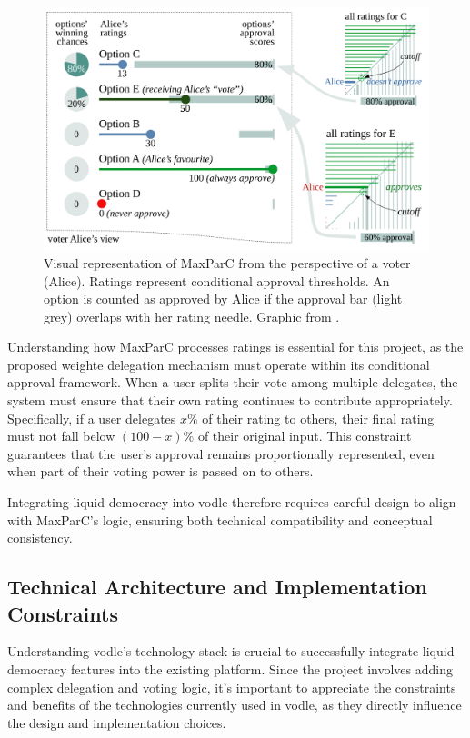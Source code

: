 \begin{figure}[H]
  \centering
  \includegraphics[width=0.8\linewidth]{../common/maxparc.png}
  \caption{Visual representation of MaxParC from the perspective of a voter (Alice). Ratings represent conditional approval thresholds. An option is counted as approved by Alice if the approval bar (light grey) overlaps with her rating needle. Graphic from \citet{heitzig_fair_2024}.}
\end{figure}

Understanding how MaxParC processes ratings is essential for this project, as the proposed weighte delegation mechanism must operate within its conditional approval framework. When a user splits their vote among multiple delegates, the system must ensure that their own rating continues to contribute appropriately. Specifically, if a user delegates $x\%$ of their rating to others, their final rating must not fall below $(100-x)\%$ of their original input. This constraint guarantees that the user's approval remains proportionally represented, even when part of their voting power is passed on to others.

Integrating liquid democracy into vodle therefore requires careful design to align with MaxParC's logic, ensuring both technical compatibility and conceptual consistency.

\subsection{Technical Architecture and Implementation Constraints}
Understanding vodle's technology stack is crucial to successfully integrate liquid democracy features into the existing platform. Since the project involves adding complex delegation and voting logic, it's important to appreciate the constraints and benefits of the technologies currently used in vodle, as they directly influence the design and implementation choices.


